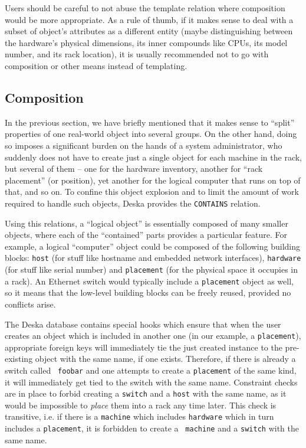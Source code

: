 \documentclass{article}
\begin{document}
Users should be careful to not abuse the template relation where composition would be more appropriate.  As a rule of
thumb, if it makes sense to deal with a subset of object's attributes as a different entity (maybe distinguishing
between the hardware's physical dimensions, its inner compounds like CPUs, its model number, and its rack location), it
is usually recommended not to go with composition or other means instead of templating.

\subsection{Composition}

In the previous section, we have briefly mentioned that it makes sense to ``split'' properties of one real-world object
into several groups.  On the other hand, doing so imposes a significant burden on the hands of a system administrator,
who suddenly does not have to create just a single object for each machine in the rack, but several of them -- one for
the hardware inventory, another for ``rack placement'' (or position), yet another for the logical computer that runs on
top of that, and so on.  To confine this object explosion and to limit the amount of work required to handle such
objects, Deska provides the {\tt CONTAINS} relation.

Using this relations, a ``logical object'' is essentially composed of many smaller objects, where each of the
``contained'' parts provides a particular feature.  For example, a logical ``computer'' object could be composed of the
following building blocks: {\tt host} (for stuff like hostname and embedded network interfaces), {\tt hardware} (for
stuff like serial number) and {\tt placement} (for the physical space it occupies in a rack).  An Ethernet switch would
typically include a {\tt placement} object as well, so it means that the low-level building blocks can be freely reused,
provided no conflicts arise.

The Deska database contains special hooks which ensure that when the user creates an object which is included in
another one (in our example, a {\tt placement}), appropriate foreign keys will immediately tie the just created instance
to the pre-existing object with the same name, if one exists.  Therefore, if there is already a switch called {\tt
foobar} and one attempts to create a {\tt placement} of the same kind, it will immediately get tied to the switch with
the same name.  Constraint checks are in place to forbid creating a {\tt switch} and a {\tt host} with the same name, as
it would be impossible to {\em place} them into a rack any time later.  This check is transitive, i.e. if there is a
{\tt machine} which includes {\tt hardware} which in turn includes a {\tt placement}, it is forbidden to create a {\tt
machine} and a {\tt switch} with the same name.
\end{document}
